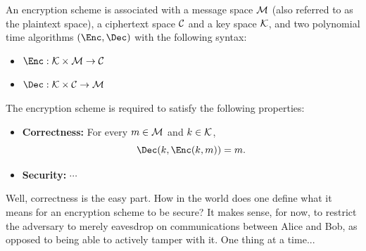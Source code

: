\begin{definition}
    An encryption scheme is associated with a message space ${\cal M}$ (also referred to as the plaintext space), a ciphertext space ${\cal C}$ and a key space ${\cal K}$, and two polynomial time algorithms $(\Enc, \Dec)$ with the following syntax:
    \begin{itemize}
        \item $\Enc:{\cal K}\times{\cal M}\rightarrow {\cal C}$
        \item $\Dec:{\cal K}\times{\cal C}\rightarrow {\cal M}$
    \end{itemize}
    The encryption scheme is required to satisfy the following properties:
    \begin{itemize}
        \item {\bf Correctness:}  For every $m\in{\cal M}$ and $k\in {\cal K}$,
        \[
        \Dec(k,\Enc(k,m))=m.
        \]
        \item {\bf Security:} $\cdots$
    \end{itemize}
\end{definition}

\noindent
Well, correctness is the easy part. How in the world does one define what it means for an encryption scheme to be secure? It makes sense, for now, to restrict the adversary to merely eavesdrop on communications between Alice and Bob, as opposed to being able to actively tamper with it. One thing at a time...

%
%

